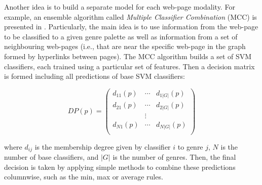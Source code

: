 Another idea is to build a separate model for each web-page modality. For example, an ensemble algorithm called \textit{Multiple Classifier Combination} (MCC) is presented in . Particularly, the main idea is to use information from the web-page to be classified to a given genre palette as well as information from a set of neighbouring web-pages (i.e., that are near the specific web-page in the graph formed by hyperlinks between pages). The MCC algorithm builds a set of SVM classifiers, each trained using a particular set of features. Then a decision matrix is formed including all predictions of base SVM classifiers:

\begin{equation}\label{chap:relevant_work:eq:GenreSim_DP}
	DP(p) = \left(
    	\begin{array}{ccc}
        	d_{11} (p) & \cdots & d_{1|G|} (p) \\
            d_{21} (p) & \cdots  & d_{2|G|} (p) \\
            & \vdots & \\
            d_{N1} (p) & \cdots  & d_{N|G|} (p) \\
         \end{array}
\right)
\end{equation}

\noindent
where $d_{ij}$ is the membership degree given by classifier $i$ to genre $j$, $N$ is the number of base classifiers, and $|G|$ is the number of genres. Then, the final decision is taken by applying simple methods to combine these predictions columnwise, such as the min, max or average rules.



